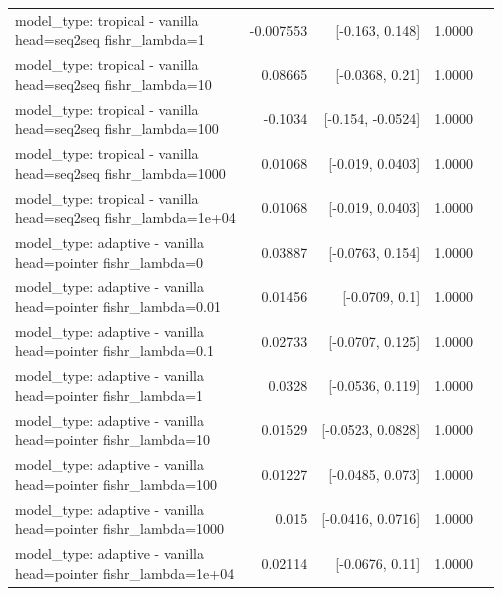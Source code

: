 \documentclass[10pt]{article}
\makeatletter
\newcommand{\stackcell}[1]{\begin{tabular}[t]{@{}l@{}}#1\end{tabular}}
\makeatother
\begin{document}
{\begin{longtable}{lrrrl}
\stackcell{model\_type: tropical - vanilla\\\footnotesize head=seq2seq fishr\_lambda=1 } & -0.007553 & [-0.163, 0.148] & 1.0000 & \\
\stackcell{model\_type: tropical - vanilla\\\footnotesize head=seq2seq fishr\_lambda=10 } & 0.08665 & [-0.0368, 0.21] & 1.0000 & \\
\stackcell{model\_type: tropical - vanilla\\\footnotesize head=seq2seq fishr\_lambda=100 } & -0.1034 & [-0.154, -0.0524] & 1.0000 & \\
\stackcell{model\_type: tropical - vanilla\\\footnotesize head=seq2seq fishr\_lambda=1000 } & 0.01068 & [-0.019, 0.0403] & 1.0000 & \\
\stackcell{model\_type: tropical - vanilla\\\footnotesize head=seq2seq fishr\_lambda=1e+04 } & 0.01068 & [-0.019, 0.0403] & 1.0000 & \\
\stackcell{model\_type: adaptive - vanilla\\\footnotesize head=pointer fishr\_lambda=0 } & 0.03887 & [-0.0763, 0.154] & 1.0000 & \\
\stackcell{model\_type: adaptive - vanilla\\\footnotesize head=pointer fishr\_lambda=0.01 } & 0.01456 & [-0.0709, 0.1] & 1.0000 & \\
\stackcell{model\_type: adaptive - vanilla\\\footnotesize head=pointer fishr\_lambda=0.1 } & 0.02733 & [-0.0707, 0.125] & 1.0000 & \\
\stackcell{model\_type: adaptive - vanilla\\\footnotesize head=pointer fishr\_lambda=1 } & 0.0328 & [-0.0536, 0.119] & 1.0000 & \\
\stackcell{model\_type: adaptive - vanilla\\\footnotesize head=pointer fishr\_lambda=10 } & 0.01529 & [-0.0523, 0.0828] & 1.0000 & \\
\stackcell{model\_type: adaptive - vanilla\\\footnotesize head=pointer fishr\_lambda=100 } & 0.01227 & [-0.0485, 0.073] & 1.0000 & \\
\stackcell{model\_type: adaptive - vanilla\\\footnotesize head=pointer fishr\_lambda=1000 } & 0.015 & [-0.0416, 0.0716] & 1.0000 & \\
\stackcell{model\_type: adaptive - vanilla\\\footnotesize head=pointer fishr\_lambda=1e+04 } & 0.02114 & [-0.0676, 0.11] & 1.0000 & \\

\end{longtable}}
\end{document}
